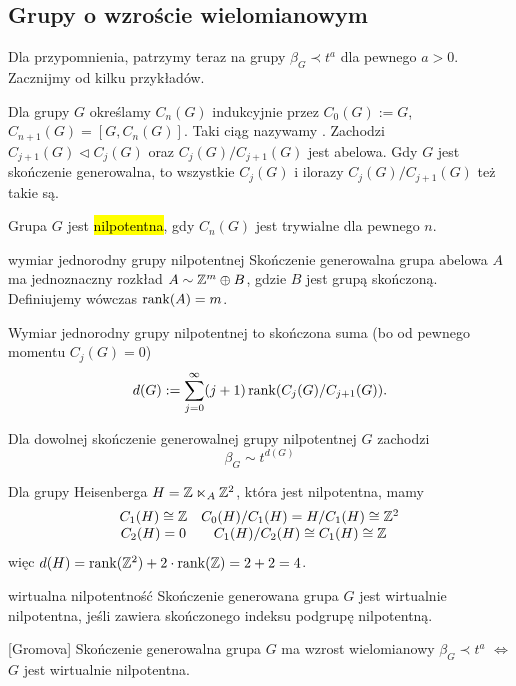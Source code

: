 \subsection{Grupy o wzroście wielomianowym}

Dla przypomnienia, patrzymy teraz na grupy $\beta_G\prec t^a$ dla pewnego $a>0$. Zacznijmy od kilku przykładów.

Dla grupy $G$ określamy $C_n(G)$ indukcyjnie przez $C_0(G):=G$, $C_{n+1}(G)=[G, C_n(G)]$. Taki ciąg nazywamy . Zachodzi $C_{j+1}(G)\triangleleft C_j(G)$ oraz $C_j(G)/C_{j+1}(G)$ jest abelowa. Gdy $G$ jest skończenie generowalna, to wszystkie $C_j(G)$ i ilorazy $C_j(G)/C_{j+1}(G)$ też takie są.

Grupa $G$ jest \hl{nilpotentna}, gdy $C_n(G)$ jest trywialne dla pewnego $n$.

\begin{definition}{wymiar jednorodny grupy nilpotentnej}{}
  Skończenie generowalna grupa abelowa $A$ ma jednoznaczny rozkład $A\sim \mathbb{Z}^m\oplus B$, gdzie $B$ jest grupą skończoną. Definiujemy wówczas $\operatorname{rank}(A)=m$.

  Wymiar jednorodny grupy nilpotentnej to skończona suma (bo od pewnego momentu $C_j(G)=0$)
  $$d(G):=\sum_{j=0}^\infty (j+1)\operatorname{rank}(C_j(G)/C_{j+1}(G)).$$
\end{definition}

\begin{fact}{}{}
  Dla dowolnej skończenie generowalnej grupy nilpotentnej $G$ zachodzi 
  $$\beta_G \sim t^{d(G)}$$
\end{fact}

\begin{example}
  Dla grupy Heisenberga $H=\mathbb{Z}\ltimes_A\mathbb{Z}^2$, która jest nilpotentna, mamy 
  $$\begin{matrix}
    C_1(H)\cong\mathbb{Z} & C_0(H)/C_1(H)=H/C_1(H)\cong\mathbb{Z}^2 \\
    C_2(H)=0  & C_1(H)/C_2(H)\cong C_1(H)\cong\mathbb{Z} 
  \end{matrix}$$
  więc $d(H)=\operatorname{rank}(\mathbb{Z}^2)+2\cdot\operatorname{rank}(\mathbb{Z})=2+2=4$.
\end{example}

\begin{definition}{wirtualna nilpotentność}{}
  Skończenie generowana grupa $G$ jest wirtualnie nilpotentna, jeśli zawiera skończonego indeksu podgrupę nilpotentną.
\end{definition}

\begin{theorem}{[Gromova]}{}
  Skończenie generowalna grupa $G$ ma wzrost wielomianowy $\beta_G\prec t^a$ $\iff$ $G$ jest wirtualnie nilpotentna.
\end{theorem}

